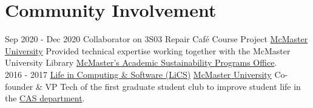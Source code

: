 \documentclass[letterpaper]{twentysecondcv} %
\begin{document}
\vspace{-1.5em}
\section{Community Involvement}
\vspace{-.5em}
\begin{twenty}
  \twentyitem
  {Sep 2020 -}
  {Dec 2020}
  {Collaborator on 3S03 Repair Caf\'{e} Course Project}
  {\href{https://www.mcmaster.ca/}{McMaster University}}
  {}
  {Provided technical expertise working together with the McMaster University Library \href{https://asp.mcmaster.ca/}{McMaster's Academic Sustainability Programs Office}.}
  \\
	\twentyitem
	{2016 - 2017}
	{}
	{\href{https://lics.cas.mcmaster.ca/node/17}{Life in Computing \& Software (LiCS)}}
	{\href{https://www.mcmaster.ca/}{McMaster University}}
	{}
	{Co-founder \& VP Tech of the first graduate student club to improve student life in the \href{https://www.eng.mcmaster.ca/cas}{CAS department}.
  }
\end{twenty}
\end{document}

